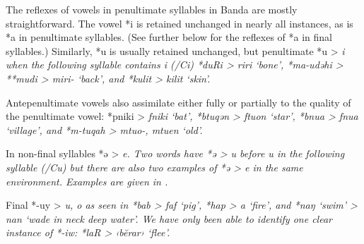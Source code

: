 The reflexes of vowels in penultimate syllables in Banda are mostly straightforward.
The vowel *i is retained unchanged in nearly all instances,
as is *a in penultimate syllables.
(See further below for the reflexes of *a in final syllables.)
Similarly, *u is usually retained unchanged,
but penultimate *u > \it{i} when the following syllable contains
\it{i} (/{\gap}Ci) *duRi > \it{riri} ‘bone’,
*ma-udəhi > **mudi > \it{miri-} ‘back’,
and *kulit > \it{kilit} ‘skin’.

Antepenultimate vowels also assimilate either fully or partially
to the quality of the penultimate vowel: *pniki > \it{fniki}
‘bat’, *btuqən > \it{ftuon} ‘star’,
*bnua > \it{fnua} ‘village’,
and *m-tuqah > \it{mtuo-, mtuen} ‘old’.

In non-final syllables *ə > \it{e}.
Two words have *ə > \it{u} before \it{u} in the following syllable
(/{\gap}Cu) but there are also two examples of *ə > \it{e} in the same environment.
 Examples are given in .


Final *-uy > \it{u, o} as seen in *bab > \it{faf} ‘pig’,
*hap > \it{a} ‘fire’,
and *naŋ ‘swim’ > \it{nan} ‘wade in neck deep water’.
We have only been able to identify one clear instance of *-iw:
*laR > ‹bĕ\it{ra}r› ‘flee’.

